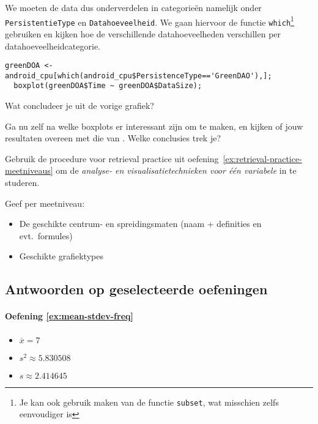 We moeten de data dus onderverdelen in categorie\"en namelijk onder \texttt{PersistentieType} en \texttt{Datahoeveelheid}. We gaan hiervoor de functie \texttt{which}\footnote{Je kan ook gebruik maken van de functie \texttt{subset}, wat misschien zelfs eenvoudiger is} gebruiken en kijken hoe de verschillende datahoeveelheden verschillen per datahoeveelheidcategorie. 

\begin{lstlisting}[breaklines=true]
  greenDOA <- android_cpu[which(android_cpu$PersistenceType=='GreenDAO'),];
  boxplot(greenDOA$Time ~ greenDOA$DataSize);
\end{lstlisting}

\begin{exercise}
  Wat concludeer je uit de vorige grafiek?
\end{exercise}

\begin{exercise}
  Ga nu zelf na welke boxplots er interessant zijn om te maken, en kijken of jouw resultaten overeen met die van \textcite{Akin2016}. Welke conclusies trek je?
\end{exercise}

\begin{exercise}
  Gebruik de procedure voor retrieval practice uit oefening~\ref{ex:retrieval-practice-meetniveaus} om de \emph{analyse- en visualisatietechnieken voor één variabele} in te studeren.
  
  Geef per meetniveau:
  
  \begin{itemize}
    \item De geschikte centrum- en spreidingsmaten (naam + definities en evt.~formules)
    \item Geschikte grafiektypes
  \end{itemize}
\end{exercise}





\subsection{Antwoorden op geselecteerde oefeningen}

\paragraph{Oefening \ref{ex:mean-stdev-freq}}

\begin{itemize}
  \item $\overline{x} = 7$
  \item $s^2 \approx 5.830508$
  \item $s \approx 2.414645$
\end{itemize}

